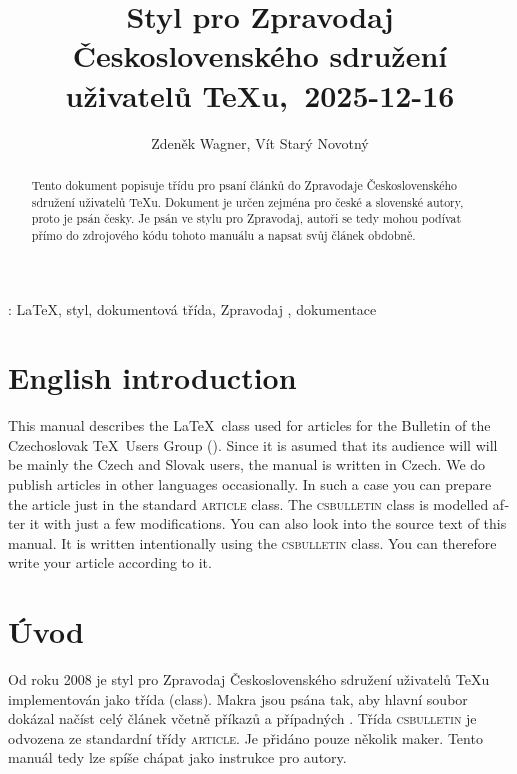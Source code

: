 \documentclass{csbulletin}
\DeclareRobustCommand\version{\unskip~2025-12-16}
\let\pkg\textsc
\begin{document}
\title{Styl pro Zpravodaj Československého sdružení uživatelů \TeX{}u,\version}
\EnglishTitle{\LaTeX\ Class for \CSTUG\ Bulletin,\version}
\author{Zdeněk Wagner, Vít Starý Novotný}
\maketitle

\begin{abstract}
Tento dokument popisuje třídu pro psaní článků do Zpravodaje Československého sdružení uživatelů
\TeX{}u. Dokument je určen zejména pro české a slovenské autory, proto je psán česky. Je psán 
ve stylu pro Zpravodaj, autoři se tedy mohou podívat přímo do zdrojového kódu tohoto manuálu a
napsat svůj článek obdobně.
\end{abstract}
\klicovaslova: \LaTeX, styl, dokumentová třída, Zpravodaj \CSTUG, dokumentace

\section{English introduction}
\begin{otherlanguage}{english}
This manual describes the \LaTeX\ class used for articles for the Bulletin of the Czechoslovak
\TeX\ Users Group (\cstug). Since it is asumed that its audience will will be mainly the Czech and
Slovak users, the manual is written in Czech. We do publish articles in other languages
occasionally. In such a case you can prepare the article just in the standard \pkg{article} class.
The \pkg{csbulletin} class is modelled after it with just a few modifications. You can also look
into the source text of this manual. It is written intentionally using the \pkg{csbulletin} class.
You can therefore write your article according to it.
\end{otherlanguage}

\section{Úvod}
Od roku 2008 je styl pro Zpravodaj Československého sdružení uživatelů \TeX{}u implementován jako
třída (class). Makra jsou psána tak, aby hlavní soubor dokázal načíst celý článek včetně příkazů
 a případných . Třída \pkg{csbulletin} je odvozena ze standardní
třídy \pkg{article}. Je přidáno pouze několik maker. Tento manuál tedy lze spíše chápat jako
instrukce pro autory.
\end{document}

